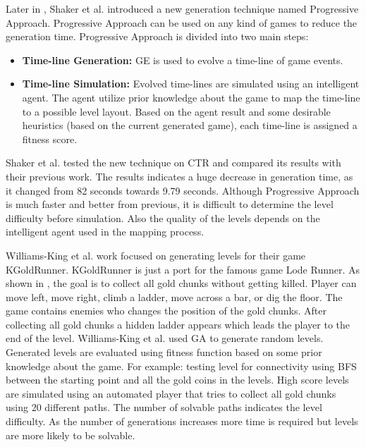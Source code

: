 Later in \cite{ctrProgressiveApproach}, Shaker et al. introduced a new generation technique named Progressive Approach. Progressive Approach can be used on any kind of games to reduce the generation time. Progressive Approach is divided into two main steps:
\begin{itemize} \itemsep0pt \parskip0pt 
	\item \textbf{Time-line Generation:} GE is used to evolve a time-line of game events.
	\item \textbf{Time-line Simulation:} Evolved time-lines are simulated using an intelligent agent. The agent utilize prior knowledge about the game to map the time-line to a possible level layout. Based on the agent result and some desirable heuristics (based on the current generated game), each time-line is assigned a fitness score.
\end{itemize}
Shaker et al. tested the new technique on CTR and compared its results with their previous work\cite{ctrSimulationApproach}. The results indicates a huge decrease in generation time, as it changed from 82 seconds towards 9.79 seconds. Although Progressive Approach is much faster and better from previous, it is difficult to determine the level difficulty before simulation. Also the quality of the levels depends on the intelligent agent used in the mapping process.\\\par


Williams-King et al.\cite{kgrAutomaticGeneration} work focused on generating levels for their game KGoldRunner. KGoldRunner is just a port for the famous game Lode Runner\cite{lodeRunner}. As shown in , the goal is to collect all gold chunks without getting killed. Player can move left, move right, climb a ladder, move across a bar, or dig the floor. The game contains enemies who changes the position of the gold chunks. After collecting all gold chunks a hidden ladder appears which leads the player to the end of the level. Williams-King et al. used GA to generate random levels. Generated levels are evaluated using fitness function based on some prior knowledge about the game. For example: testing level for connectivity using BFS between the starting point and all the gold coins in the levels. High score levels are simulated using an automated player that tries to collect all gold chunks using 20 different paths. The number of solvable paths indicates the level difficulty. As the number of generations increases more time is required but levels are more likely to be solvable.

